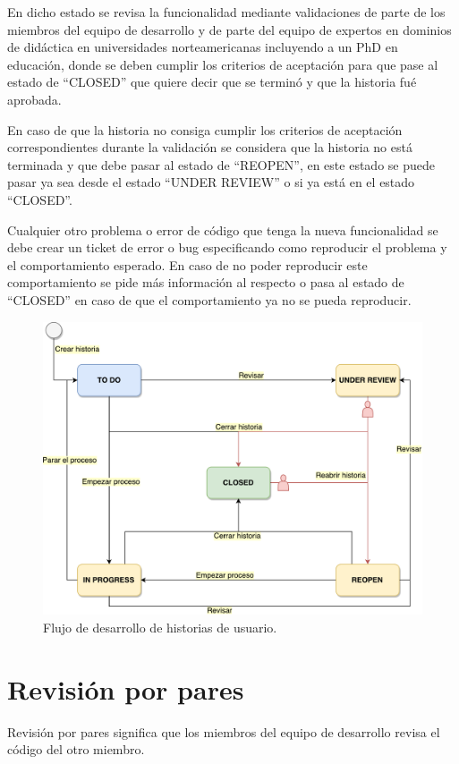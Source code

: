 En dicho estado se revisa la funcionalidad mediante validaciones de parte de los miembros del equipo de desarrollo y de parte del equipo de expertos en dominios de didáctica en universidades norteamericanas incluyendo a un PhD en educación, donde se deben cumplir los criterios de aceptación para que pase al estado de \enquote{CLOSED} que quiere decir que se terminó y que la historia fué aprobada.  

En caso de que la historia no consiga cumplir los criterios de aceptación correspondientes durante la validación se considera que la historia no está terminada y que debe pasar al estado de \enquote{REOPEN}, en este estado se puede pasar ya sea desde el estado \enquote{UNDER REVIEW} o si ya está en el estado \enquote{CLOSED}.

Cualquier otro problema o error de código que tenga la nueva funcionalidad se debe crear un ticket de error o bug especificando como reproducir el problema y el comportamiento esperado. En caso de no poder reproducir este comportamiento se pide más información al respecto o pasa al estado de \enquote{CLOSED} en caso de que el comportamiento ya no se pueda reproducir.

\begin{figure}[]
\centering
\includegraphics[scale=0.4]{Figuras/workflow}
\caption{Flujo de desarrollo de historias de usuario.}
  \label{workflow}
\end{figure}

\section{Revisión por pares}
Revisión por pares significa que los miembros del equipo de desarrollo revisa el código del otro miembro.

